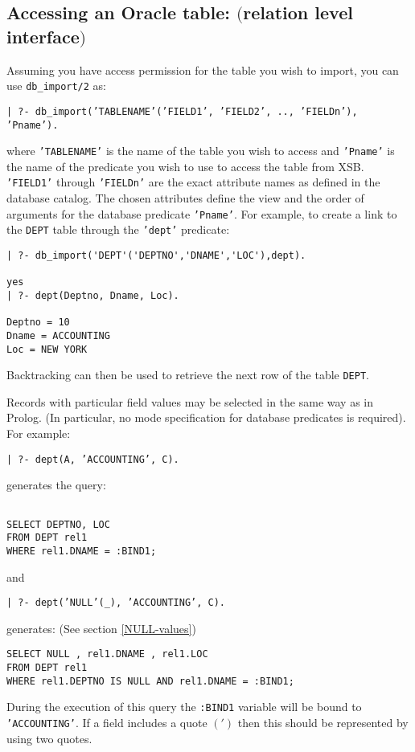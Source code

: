 \subsection{Accessing an Oracle table: $($relation level interface$)$}

Assuming you have access permission for the table you wish to import,
you can use {\tt db\_import/2} as:
\begin{center}
{\tt | ?- db\_import('TABLENAME'('FIELD1', 'FIELD2', .., 'FIELDn'), 'Pname').}
\end{center}
where {\tt 'TABLENAME'} is the name of the table you wish to access
and {\tt 'Pname'} is the name of the predicate you wish to use to
access the table from XSB. {\tt 'FIELD1'} through {\tt 'FIELDn'} are
the exact attribute names as defined in the database catalog.  The
chosen attributes define the view and the order of arguments for the
database predicate {\tt 'Pname'}.  For example, to create a link to
the {\tt DEPT} table through the {\tt 'dept'} predicate:
\begin{verbatim}
| ?- db_import('DEPT'('DEPTNO','DNAME','LOC'),dept).

yes
| ?- dept(Deptno, Dname, Loc).

Deptno = 10
Dname = ACCOUNTING
Loc = NEW YORK 
\end{verbatim}

Backtracking can then be used to retrieve the next row of the table {\tt DEPT}.

Records with particular field values may be selected in the same way
as in Prolog.  (In particular, no mode specification for database predicates is
required). For example:
\begin{center}

{\tt | ?- dept(A, 'ACCOUNTING', C).}
\end{center}
generates the query:
\begin{verbatim}

SELECT DEPTNO, LOC
FROM DEPT rel1
WHERE rel1.DNAME = :BIND1;
\end{verbatim}
and 
\begin{center}

{\tt | ?- dept('NULL'(\_), 'ACCOUNTING', C).}
\end{center}
generates: (See section \ref{NULL-values})
\begin{verbatim}
SELECT NULL , rel1.DNAME , rel1.LOC
FROM DEPT rel1
WHERE rel1.DEPTNO IS NULL AND rel1.DNAME = :BIND1;
\end{verbatim}
During the execution of this query the {\tt :BIND1} variable will be bound
to {\tt 'ACCOUNTING'}.\newline
If a field includes a quote $(')$ then this should be represented by
using two quotes.

